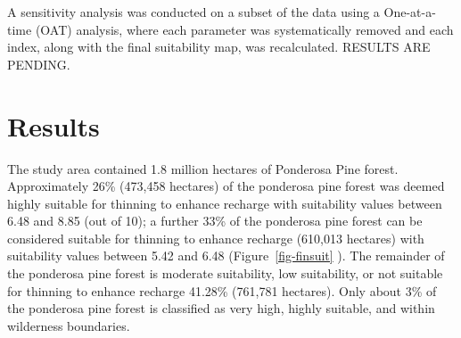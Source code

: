 \documentclass[
  number,
  preprint,
  3p,
  onecolumn]{elsarticle}
\begin{document}
A sensitivity analysis was conducted on a subset of the data using a
One-at-a-time (OAT) analysis, where each parameter was systematically
removed and each index, along with the final suitability map, was
recalculated. RESULTS ARE PENDING.

\section{Results}\label{results}

The study area contained 1.8 million hectares of Ponderosa Pine forest.
Approximately 26\% (473,458 hectares) of the ponderosa pine forest was
deemed highly suitable for thinning to enhance recharge with suitability
values between 6.48 and 8.85 (out of 10); a further 33\% of the
ponderosa pine forest can be considered suitable for thinning to enhance
recharge (610,013 hectares) with suitability values between 5.42 and
6.48 (Figure~\ref{fig-finsuit} ). The remainder of the ponderosa pine
forest is moderate suitability, low suitability, or not suitable for
thinning to enhance recharge 41.28\% (761,781 hectares). Only about 3\%
of the ponderosa pine forest is classified as very high, highly
suitable, and within wilderness boundaries.
\end{document}
